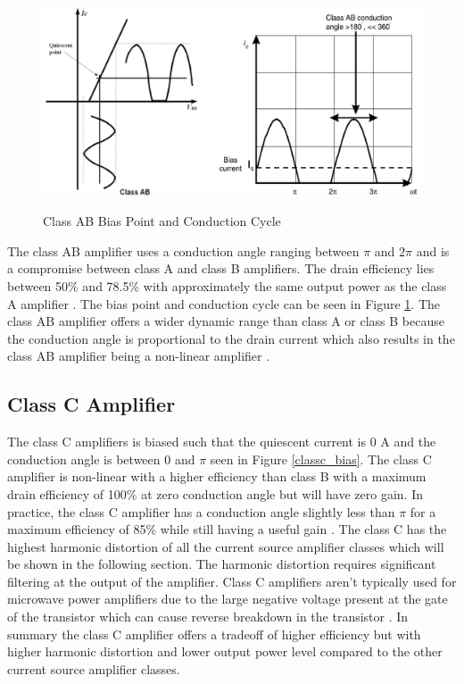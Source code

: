\begin{figure}
  \centering
  \includegraphics[width=6in]{figures/classes/classab_bias}\\
  \caption{Class AB Bias Point and Conduction Cycle \cite{Rosu2001}}\label{classab_bias}
\end{figure}


The class AB amplifier uses a conduction angle ranging between $\pi$ and $2\pi$ and is a compromise between class A and class B amplifiers. The drain efficiency lies between 50\% and 78.5\% with approximately the same output power as the class A amplifier \cite{C.Cripps2006}. The bias point and conduction cycle can be seen in Figure \ref{classab_bias}. The class AB amplifier offers a wider dynamic range than class A or class B because the conduction angle is proportional to the drain current which also results in the class AB amplifier being a non-linear amplifier \cite{C.Cripps2006}.

\subsection{Class C Amplifier}

The class C amplifiers is biased such that the quiescent current is 0 A and the conduction angle is between $0$ and $\pi$ seen in Figure \ref{classc_bias}. The class C amplifier is non-linear with a higher efficiency than class B with a maximum drain efficiency of 100\% at zero conduction angle but will have zero gain. In practice, the class C amplifier has a conduction angle slightly less than $\pi$ for a maximum efficiency of 85\% while still having a useful gain \cite{Raab2003}. The class C has the highest harmonic distortion of all the current source amplifier classes which will be shown in the following section. The harmonic distortion requires significant filtering at the output of the amplifier. Class C amplifiers aren't typically used for microwave power amplifiers due to the large negative voltage present at the gate of the transistor which can cause reverse breakdown in the transistor \cite{C.Cripps2006}. In summary the class C amplifier offers a tradeoff of higher efficiency but with higher harmonic distortion and lower output power level compared to the other current source amplifier classes.

